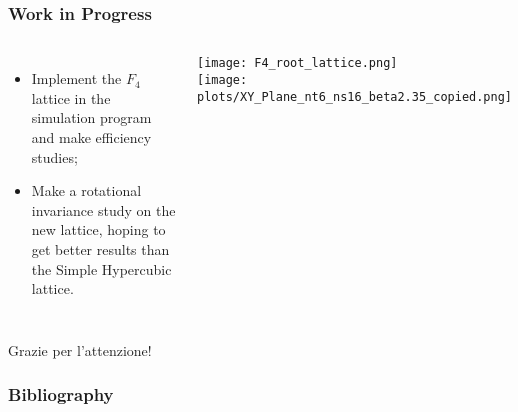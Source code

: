 \documentclass{beamer}
\begin{document}
\begin{frame}
  \frametitle{Work in Progress}
  \begin{columns}
    \begin{itemize}
    \item Implement the $F_4$ lattice in the simulation program and make efficiency studies;
    \vspace{6\baselineskip}
    \item Make a rotational invariance study on the new lattice, hoping to get better results than the Simple Hypercubic lattice.
    \end{itemize}
    
    \texttt{[image: F4\_root\_lattice.png]}\\
    \vspace{\baselineskip}
    \texttt{[image: plots/XY\_Plane\_nt6\_ns16\_beta2.35\_copied.png]}
  \end{columns}
\end{frame}

\begin{frame}
  \centering
  \Huge
  Grazie per l'attenzione!
\end{frame}

\begin{frame}[allowframebreaks]
  \frametitle{Bibliography}
  \printbibliography
\end{frame}
\end{document}
